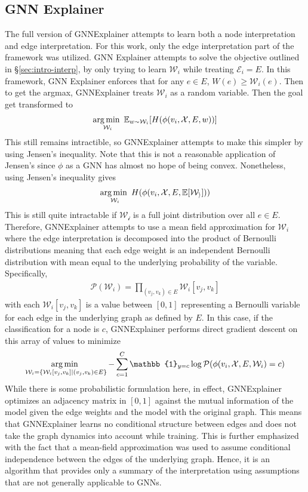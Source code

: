 \subsection{GNN Explainer}
The full version of GNNExplainer attempts to learn both a node interpretation and edge interpretation. For this work, only the edge interpretation part of the framework was utilized. GNN Explainer attempts to solve the objective outlined in \S\ref{sec:intro-interp}, by only trying to learn $\mathcal{W}_i$ while treating $\mathcal{E}_i = E$. In this framework, GNN Explainer enforces that for any $e \in E$, $W(e) \geq \mathcal{W}_i(e)$. Then to get the argmax, GNNExplainer treats $\mathcal{W}_i$ as a random variable. Then the goal get transformed to 
\begin{align*}
	\operatorname*{arg\,min\,\,}_{\mathcal{W}_i} \mathbb{E}_{w \sim \mathcal{W}_i} [H(\phi(v_i, \mathcal{X}, E, w))]
\end{align*}
This still remains intractible, so GNNExplainer attempts to make this simpler by using Jensen's inequality. Note that this is not a reasonable application of Jensen's since $\phi$ as a GNN has almost no hope of being convex. Nonetheless, using Jensen's inequality gives
\begin{align*}
	\operatorname*{arg\,min\,\,}_{\mathcal{W}_i} H(\phi(v_i, \mathcal{X}, E, \mathbb{E}[\mathcal{W_i}]))
\end{align*}
This is still quite intractable if $\mathcal{W_i}$ is a full joint distribution over all $e \in E$. Therefore, GNNExplainer attempts to use a mean field approximation for $\mathcal{W}_i$ where the edge interpretation is decomposed into the product of Bernoulli distributions meaning that each edge weight is an independent Bernoulli distribution with mean equal to the underlying probability of the variable. Specifically,
\begin{align*}
	\mathcal{P}(\mathcal{W}_i) = \prod_{(v_j, v_k) \in E} \mathcal{W}_i[v_j, v_k]
\end{align*}
with each $\mathcal{W}_i[v_j, v_k]$ is a value between $[0, 1]$ representing a Bernoulli variable for each edge in the underlying graph as defined by $E$. In this case, if the classification for a node is $c$, GNNExplainer performs direct gradient descent on this array of values to minimize
\begin{align*}
	\argmin_{\mathcal{W}_i = \{\mathcal{W}_i[v_j, v_k] \mid (v_j, v_k) \in E\}} -\sum_{c=1}^C \mathbb{1}_{y = c} \log \mathcal{P}(\phi(v_i, \mathcal{X}, E, \mathcal{W}_i) = c)
\end{align*}
While there is some probabilistic formulation here, in effect, GNNExplainer optimizes an adjacency matrix in $[0, 1]$ against the mutual information of the model given the edge weights and the model with the original graph. This means that GNNExplainer learns no conditional structure between edges and does not take the graph dynamics into account while training. This is further emphasized with the fact that a mean-field approximation was used to assume conditional independence between the edges of the underlying graph. Hence, it is an algorithm that provides only a summary of the interpretation using assumptions that are not generally applicable to GNNs.
